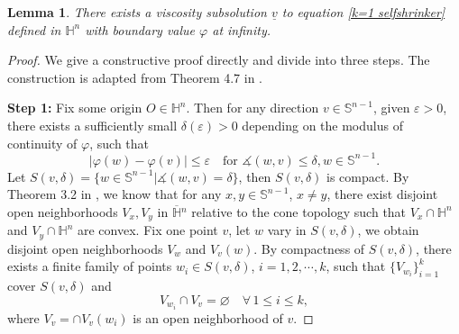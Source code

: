 \documentclass[reqno]{amsart}
\newtheorem{lemma}[theorem]{Lemma}
\theoremstyle{remark}
\theoremstyle{definition}
\numberwithin{equation}{section}
\begin{document}
\begin{lemma}
    There exists a viscosity subsolution $\underline{v}$ to equation \eqref{k=1 selfshrinker} defined in $\mathbb{H}^n$ with boundary value $\varphi$ at infinity.
\end{lemma}
\begin{proof}
We give a constructive proof directly and divide into three steps. The construction is adapted from Theorem 4.7 in \cite{Choi}.

\textbf{Step 1:} Fix some origin $O \in \mathbb{H}^n$. Then for any direction $v\in \mathbb{S}^{n-1}$, given $\varepsilon > 0$, there exists a sufficiently small $\delta(\varepsilon)>0$ depending on the modulus of continuity of $\varphi$, such that
\[
|\varphi(w) - \varphi(v)| \leqslant \varepsilon \quad \text{for } \measuredangle (w, v) \leqslant \delta, w \in \mathbb{S}^{n-1}.
\]
Let $S(v, \delta) = \{ w \in \mathbb{S}^{n-1} | \measuredangle (w, v) = \delta \}$, then $S(v, \delta)$ is compact. By Theorem 3.2 in \cite{Anderson}, we know that for any $x, y \in \mathbb{S}^{n-1}$, $x \neq y$, there exist disjoint open neighborhoods $V_x, V_y$ in $\overline{\mathbb{H}}{}^n$ relative to the cone topology such that $V_x \cap \mathbb{H}^n$ and $V_y \cap \mathbb{H}^n$ are convex. Fix one point $v$, let $w$ vary in $S(v, \delta)$, we obtain disjoint open neighborhoods $V_{w}$ and $V_v(w)$. By compactness of $S(v, \delta)$, there exists a finite family of points $w_i \in S(v, \delta)$, $i=1,2,\cdots,k$, such that $\{V_{w_i}\}_{i=1}^k$ cover $S(v, \delta)$ and 
\[
V_{w_i} \cap V_{v} = \varnothing \quad \forall \, 1 \leqslant i \leqslant k,
\]
where $V_{v} = \cap V_{v}(w_i)$ is an open neighborhood of $v$.


\end{proof}
\end{document}
